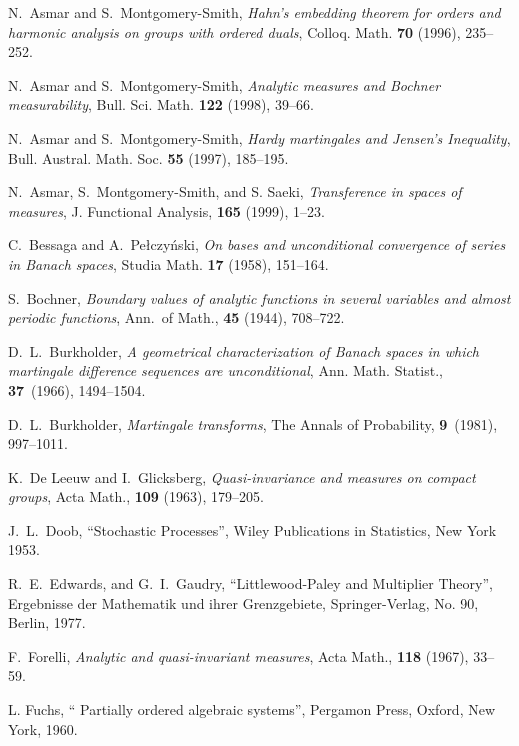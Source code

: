 \documentclass[12pt,leqno]{article}
\begin{document}
\begin{thebibliography}{Dillo 83}

  N.\ Asmar and S.\ Montgomery-Smith,
{\em Hahn's embedding theorem for orders
and harmonic analysis on groups with ordered duals}, Colloq. Math. {\bf 70} (1996),  235--252.

  N.\ Asmar and S.\ Montgomery-Smith, 
{\em Analytic measures and Bochner measurability},
Bull. Sci. Math. {\bf 122} (1998),  39--66.

  N.\ Asmar and S.\ Montgomery-Smith, 
{\em Hardy martingales and Jensen's Inequality}, Bull. Austral. Math. Soc. {\bf 55} (1997), 185--195.

  N.\ Asmar, S.\ Montgomery-Smith, and S. Saeki,
{\em Transference in spaces of measures},
 J. Functional Analysis, {\bf 165} (1999), 1--23. 

  C.\ Bessaga and A.\ Pe\l czy\'nski, 
{\em On bases and unconditional convergence of series in Banach spaces}, 
Studia Math. {\bf 17} (1958), 151--164.

 S.\ Bochner, 
{\em Boundary values of analytic functions in 
several variables and almost periodic functions}, 
Ann.\ of Math., {\bf 45} (1944), 708--722.



  D.\ L.\ Burkholder, 
{\em A geometrical characterization of Banach 
spaces in which martingale difference sequences are unconditional}, 
Ann. Math. Statist., {\bf 37}\ (1966), 1494--1504.

  D.\ L.\ Burkholder, 
{\em Martingale transforms}, 
The Annals of Probability, {\bf 9}\ (1981), 997--1011.



  K.\ De Leeuw and I.\ Glicksberg, 
{\em Quasi-invariance and measures on compact groups},
Acta Math., {\bf 109} (1963), 179--205.

  J.\ L.\ Doob,
``Stochastic Processes'', Wiley Publications in Statistics, New York 1953. 

    R.\ E.\ Edwards, and G.\ I.\ Gaudry,
``Littlewood-Paley and Multiplier Theory'', 
Ergebnisse der Mathematik
und ihrer Grenzgebiete, Springer-Verlag, No. 90,  
Berlin, 1977.

  F.\ Forelli,
{\em Analytic and quasi-invariant measures}, 
Acta Math., {\bf 118} (1967), 33--59.

  L. Fuchs,
`` Partially ordered algebraic systems'', 
Pergamon Press, Oxford, New York, 1960.


\end{thebibliography}
\end{document}
